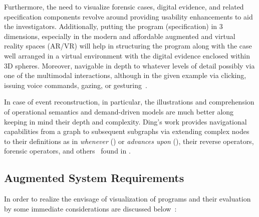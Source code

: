 Furthermore, the need to visualize forensic cases, 
digital evidence, and related specification components revolve around 
providing usability enhancements to aid the investigators. Additionally, putting the 
program (specification) in 3 dimensions, especially in the modern
and affordable augmented and virtual reality spaces (AR/VR) will help in structuring the program 
along with the case well arranged in a virtual environment with the digital 
evidence enclosed within 3D spheres. Moreover, navigable in depth to whatever 
levels of detail possibly via one of the multimodal interactions, although in 
the given example via clicking, issuing voice commands, gazing, or
gesturing~\cite{flucid-dfg-viz-pst2011}.

In case of event reconstruction, 
in particular, the illustrations and comprehension of operational semantics 
and demand-driven models are much better along keeping in mind their depth 
and complexity. Ding's work provides navigational capabilities from a graph 
to subsequent subgraphs via extending complex nodes to their definitions as 
in \emph{whenever} () or \emph{advances upon}
(), their reverse operators, forensic operators, and others~\cite{flucid-dfg-viz-pst2011}
found in \cite[Chapter 7]{mokhov-phd-thesis-2013}.

\subsection{Augmented System Requirements}

In order to realize the envisage of {\dfg} visualization of {\flucid} 
programs and their evaluation by {\gipsy} some immediate considerations are 
discussed below~\cite{flucid-dfg-viz-pst2011}:

